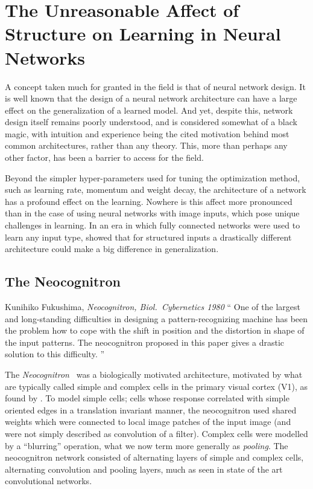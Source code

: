 \documentclass[thesis]{subfiles}
\begin{document}
	\chapter{The Unreasonable Affect of Structure on Learning in Neural Networks}
	\label{motivation}
	
	A concept taken much for granted in the field is that of neural network design. It is well known that the design of a neural network architecture can have a large effect on the generalization of a learned model. And yet, despite this, network design itself remains poorly understood, and is considered somewhat of a black magic, with intuition and experience being the cited motivation behind most common architectures, rather than any theory. This, more than perhaps any other factor, has been a barrier to access for the field.
	
	Beyond the simpler hyper-parameters used for tuning the optimization method, such as learning rate, momentum and weight decay, the architecture of a network has a profound effect on the learning. Nowhere is this affect more pronounced than in the case of using neural networks with image inputs, which pose unique challenges in learning. In an era in which fully connected networks were used to learn any input type, \citet{Fuk80} showed that for structured inputs a drastically different architecture could make a big difference in generalization. 
	
	\section{The Neocognitron}
	\begin{chapquote}{Kunihiko Fukushima, \textit{Neocognitron, 
				Biol.\ Cybernetics 1980}}
		`` One of the largest and long-standing difficulties in designing a pattern-recognizing machine has been the problem how to cope with the shift in position and the distortion in shape of the input patterns. The neocognitron proposed in this paper gives a drastic solution to this difficulty.
		''
	\end{chapquote}
	
	The \emph{Neocognitron}~\citep{Fuk80, fukushima2013artificial} was a biologically motivated architecture, motivated by what are typically called simple and complex cells in the primary visual cortex (V1), as found by \citet{Hubel1959a}. To model simple cells; cells whose response correlated with simple oriented edges in a translation invariant manner, the neocognitron used shared weights which were connected to local image patches of the input image (and were not simply described as convolution of a filter). Complex cells were modelled by a ``blurring'' operation, what we now term more generally as \emph{pooling}. The neocognitron network consisted of alternating layers of simple and complex cells, \ie alternating convolution and pooling layers, much as seen in state of the art convolutional networks.
\end{document}
